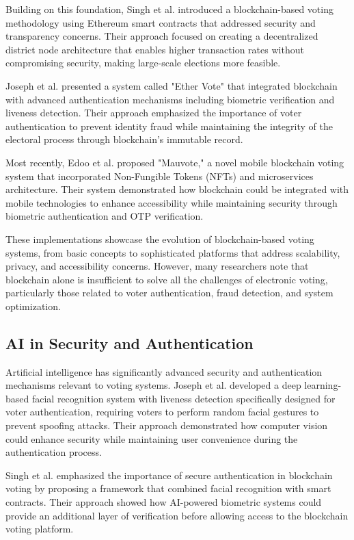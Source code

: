 \documentclass[conference]{IEEEtran}
\begin{document}
Building on this foundation, Singh et al. \cite{b7} introduced a blockchain-based voting methodology using Ethereum smart contracts that addressed security and transparency concerns. Their approach focused on creating a decentralized district node architecture that enables higher transaction rates without compromising security, making large-scale elections more feasible.

Joseph et al. \cite{b8} presented a system called "Ether Vote" that integrated blockchain with advanced authentication mechanisms including biometric verification and liveness detection. Their approach emphasized the importance of voter authentication to prevent identity fraud while maintaining the integrity of the electoral process through blockchain's immutable record.

Most recently, Edoo et al. \cite{b9} proposed "Mauvote," a novel mobile blockchain voting system that incorporated Non-Fungible Tokens (NFTs) and microservices architecture. Their system demonstrated how blockchain could be integrated with mobile technologies to enhance accessibility while maintaining security through biometric authentication and OTP verification.

These implementations showcase the evolution of blockchain-based voting systems, from basic concepts to sophisticated platforms that address scalability, privacy, and accessibility concerns. However, many researchers note that blockchain alone is insufficient to solve all the challenges of electronic voting, particularly those related to voter authentication, fraud detection, and system optimization.

\subsection{AI in Security and Authentication}
Artificial intelligence has significantly advanced security and authentication mechanisms relevant to voting systems. Joseph et al. \cite{b8} developed a deep learning-based facial recognition system with liveness detection specifically designed for voter authentication, requiring voters to perform random facial gestures to prevent spoofing attacks. Their approach demonstrated how computer vision could enhance security while maintaining user convenience during the authentication process.

Singh et al. \cite{b7} emphasized the importance of secure authentication in blockchain voting by proposing a framework that combined facial recognition with smart contracts. Their approach showed how AI-powered biometric systems could provide an additional layer of verification before allowing access to the blockchain voting platform.
\end{document}
